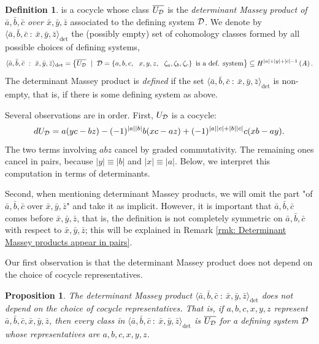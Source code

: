 \documentclass[11pt]{article}
\newtheorem{proposition}[theorem]{Proposition}
\theoremstyle{definition}
\theoremstyle{definition}
\newtheorem{definition}[theorem]{Definition}
\begin{document}
\begin{definition}
is a cocycle whose class $\overline{U_{\mathcal D}}$
is the \emph{determinant Massey product of
$\bar a, \bar b, \bar c$ over $\bar x,\bar y,\bar z$} associated to the defining system $\mathcal D$.
We denote by $\langle \bar a,\bar b,\bar c \ :\ \bar x, \bar y, \bar z\rangle_{\det}$ the (possibly empty) set of cohomology classes
formed by all possible choices of defining systems, 
\begin{equation*}
\langle \bar a,\bar b,\bar c \ :\ \bar x, \bar y, \bar z\rangle_{\det} = \left\{ \overline{U_{\mathcal D}} \ \mid \
\mathcal D = \left\{a,b,c,\ \ x,y,z,\ \ \zeta_a,\zeta_b,\zeta_c\right\} \textrm{ is a def. system} \right\}
\subseteq H^{|a|+|y|+|c|-1}\left(A\right).
\end{equation*}
The determinant Massey product is \emph{defined} if the set $\langle \bar a,\bar b,\bar c \ :\ \bar x, \bar y, \bar z\rangle_{\det}$ is non-empty,
that is, if there is some defining system as above.
\end{definition}







Several observations are in order.
First, $U_{\mathcal D}$ is a cocycle:
\begin{equation*}
dU_{\mathcal D}=a(yc-bz)-(-1)^{|a||b|}b(xc-az) +(-1)^{|a||c|+|b||c|}c(xb-ay). 
\end{equation*} 
The two terms involving $abz$ cancel by graded commutativity. 
The remaining ones cancel in pairs, because $|y|\equiv|b|$ and $|x|\equiv|a|$.
Below, we interpret this computation in terms of determinants.

Second, when mentioning determinant Massey products, 
we will omit the part "of $\bar a,\bar b,\bar c$ over $\bar x,\bar y,\bar z$"
and take it as implicit. 
However, it is important that $\bar a,\bar b,\bar c$ comes before $\bar x, \bar y, \bar z$, that is, the definition is not 
completely symmetric on $\bar a,\bar b,\bar c$ with respect to $\bar x, \bar y, \bar z$; this will be explained in 
Remark \ref{rmk: Determinant Massey products appear in pairs}.


\smallskip





Our first observation is that the determinant Massey product does not 
depend on the choice of cocycle representatives.



\begin{proposition}
\label{prop: determinant massey doesnt depend on cocycle representatives}
The determinant Massey product $\langle \bar a,\bar b,\bar c \ :\ \bar x, \bar y, \bar z\rangle_{\det}$ 
does not depend on the choice of cocycle representatives.
That is, if $a,b,c,x,y,z$ represent $\bar a,\bar b,\bar c,\bar x,\bar y,\bar z$, 
then every class in 
$\langle \bar a,\bar b,\bar c \ :\ \bar x, \bar y, \bar z\rangle_{\det}$ is
$\overline{U_{\mathcal D}}$ for a defining system $\mathcal D$ whose representatives are $a,b,c,x,y,z$. 
\end{proposition}
\end{document}
